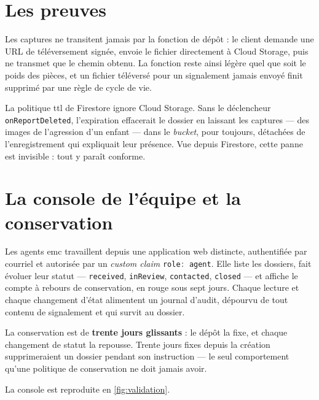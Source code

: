 \documentclass[11pt,a4paper,oneside,openany]{report}
\begin{document}
\section{Les preuves}
\label{sec:preuves}

Les captures ne transitent jamais par la fonction de dépôt : le client demande
une URL de téléversement signée, envoie le fichier directement à Cloud Storage,
puis ne transmet que le chemin obtenu. La fonction reste ainsi légère quel que
soit le poids des pièces, et un fichier téléversé pour un signalement jamais
envoyé finit supprimé par une règle de cycle de vie.

\begin{vigilance}
\small
La politique \gls{ttl} de Firestore ignore Cloud Storage. Sans le déclencheur
\texttt{onReportDeleted}, l'expiration effacerait le dossier en laissant les
captures — des images de l'agression d'un enfant — dans le \emph{bucket}, pour
toujours, détachées de l'enregistrement qui expliquait leur présence. Vue depuis
Firestore, cette panne est invisible : tout y paraît conforme.
\end{vigilance}

\section{La console de l'équipe et la conservation}
\label{sec:console}

Les agents \gls{emc} travaillent depuis une application web distincte, authentifiée
par courriel et autorisée par un \emph{custom claim}
\lstinline[language=TypeScript]|role: agent|. Elle liste les dossiers, fait évoluer
leur statut — \texttt{received}, \texttt{inReview}, \texttt{contacted},
\texttt{closed} — et affiche le compte à rebours de conservation, en rouge sous
sept jours. Chaque lecture et chaque changement d'état alimentent un journal
d'audit, dépourvu de tout contenu de signalement et qui survit au dossier.

\begin{decision}
\small
La conservation est de \textbf{trente jours glissants} : le dépôt la fixe, et
chaque changement de statut la repousse. Trente jours fixes depuis la création
supprimeraient un dossier pendant son instruction — le seul comportement qu'une
politique de conservation ne doit jamais avoir.
\end{decision}

\noindent La console est reproduite en \cref{fig:validation}.

\end{document}
